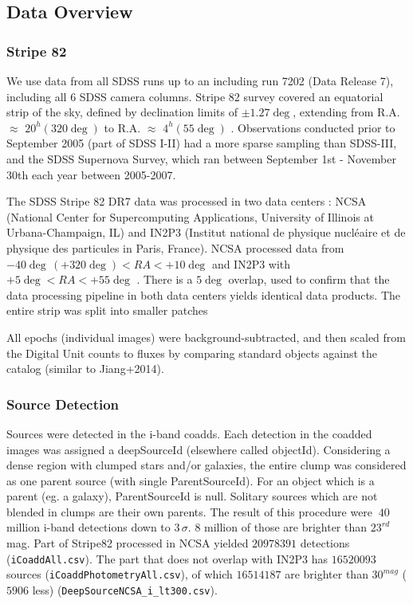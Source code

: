 \documentclass[fleqn,usenatbib]{mnras}  %
\begin{document}
\subsection{Data Overview}
\label{sec:data}
\subsubsection{Stripe 82}
We use data from all SDSS runs up to an including run 7202 (Data Release 7), including all 6 SDSS camera columns. Stripe 82 survey covered an equatorial strip of the sky, defined by declination limits of $\pm1.27\deg$, extending from R.A. $\approx$ $20^{h} (320 \deg)$ to R.A.  $\approx$ $4^{h} (55 \deg)$ \citep{sesar2007,sesar2010}. Observations conducted prior to September 2005 (part of SDSS I-II) had a more sparse sampling than SDSS-III, and the SDSS Supernova Survey, which ran between September 1st - November 30th each year between 2005-2007. 

The SDSS Stripe 82 DR7  data  was processed in two data centers : NCSA (National Center for Supercomputing Applications, University of Illinois at Urbana-Champaign, IL) and IN2P3  (Institut national de physique nucl\'eaire et de physique des particules in Paris, France). NCSA processed data from $-40 \deg \, (+320 \deg) < RA < +10 \deg $ and IN2P3 with $ +5 \deg < RA < +55 \deg$ . There is a $5 \deg$ overlap, used to confirm that the data processing pipeline in both data centers yields identical data products. The entire strip was split into smaller patches

All epochs (individual images) were background-subtracted, and then scaled from the Digital Unit counts to fluxes by comparing standard objects against the \citep{ivezic2007} catalog  (similar to  Jiang+2014).   

\subsubsection{Source Detection}
Sources were detected in the i-band coadds. Each detection in the coadded images was assigned a deepSourceId (elsewhere called objectId). Considering  a dense region with clumped stars and/or galaxies, the entire clump was considered as one parent source (with single ParentSourceId). For an object which is a parent (eg. a galaxy), ParentSourceId is null. Solitary sources which are not blended  in clumps are their own parents. The result of this procedure were $~40$ million  i-band detections down to $3 \, \sigma$.  $8$ million of those are brighter than $23^{rd}$ mag. Part of Stripe82 processed in NCSA yielded  $20978391$ detections (\verb|iCoaddAll.csv|). The part that does not overlap with IN2P3 has   $16520093$ sources (\verb|iCoaddPhotometryAll.csv|), of which  $16514187$ are brighter than $30^{mag}$  ($5906$ less) (\verb|DeepSourceNCSA_i_lt300.csv|).
\end{document}
